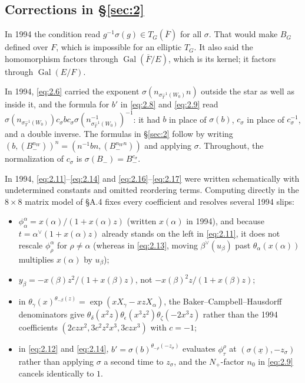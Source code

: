 \documentclass[12pt,letterpaper]{amsart}
\theoremstyle{plain}
\theoremstyle{definition}
\theoremstyle{remark}
\theoremstyle{definition}
\newcommand{\ovF}{\overline{F}}
\newcommand{\eps}{\epsilon}
\newcommand{\unx}{\underline{x}}
\DeclareMathOperator{\Gal}{Gal}
\begin{document}
\subsection*{Corrections in \S\ref{sec:2}}

\begin{rem26}\label{rem:2.cocycle}
In 1994 the condition read $g^{-1}\sigma(g)\in T_G(\overline{F})$ for all
$\sigma$. That would make $B_G$ defined over $F$, which is impossible for an
elliptic $T_G$. It also said the homomorphism factors through
$\Gal(\ovF/E)$, which is its kernel; it factors through $\Gal(E/F)$.
\end{rem26}

\begin{rem26}\label{rem:2.8}
In 1994, \eqref{eq:2.6} carried the exponent
$\sigma(n_{\sigma_T^{-1}(W_0)}n)$ outside the star as well as inside it, and the
formula for $b'$ in \eqref{eq:2.8} and \eqref{eq:2.9} read
$\sigma(n_{\sigma^{-1}_T (W_0)})c_\sigma b
c_\sigma\sigma(n^{-1}_{\sigma^{-1}_T (W_0)})^{-1}$: it had $b$ in place of
$\sigma(b)$, $c_\sigma$ in place of $c_\sigma^{-1}$, and a double inverse. The formulas in \S\ref{sec:2} follow by writing
$(b,(B_-^{n_W}))^n=(n^{-1}bn,(B_-^{n_Wn}))$ and applying $\sigma$.
Throughout, the normalization of $c_\sigma$ is
$\sigma(B_-)=B_-^{c_\sigma}$.
\end{rem26}

\begin{rem26}\label{rem:2.11}
In 1994, \eqref{eq:2.11}--\eqref{eq:2.14} and \eqref{eq:2.16}--\eqref{eq:2.17}
were written schematically with undetermined constants and omitted reordering
terms. Computing directly in the $8\times 8$ matrix model of \S A.4 fixes every
coefficient and resolves several 1994 slips:
\begin{itemize}
\item $\phi^\alpha_\alpha=x(\alpha)/(1+x(\alpha)z)$ (written $x(\alpha)$ in
1994), and because $t=\alpha^\vee(1+x(\alpha)z)$ already stands on the left in
\eqref{eq:2.11}, it does not rescale $\phi^\alpha_\rho$ for $\rho\neq\alpha$
(whereas in \eqref{eq:2.13}, moving $\beta^\vee(u_\beta)$ past $\theta_\alpha(x(\alpha))$
multiplies $x(\alpha)$ by $u_\beta$);
\item $y_\beta=-x(\beta)z^2/(1+x(\beta)z)$, not $-x(\beta)^2z/(1+x(\beta)z)$;
\item in $\theta_\gamma(x)^{\theta_{-\beta}(z)}=\exp(xX_\gamma-xzX_\alpha)$, the
Baker--Campbell--Hausdorff denominators give $\theta_\delta(x^2z)\theta_\eps(x^3z^2)\theta_\zeta(-2x^3z)$
rather than the 1994 coefficients $(2czx^2,3c^2z^2x^3,3czx^3)$ with $c=-1$;
\item in \eqref{eq:2.12} and \eqref{eq:2.14}, $b'=\sigma(b)^{\theta_{-\rho}(-z_\sigma)}$
evaluates $\phi^\rho_\tau$ at $(\sigma(\unx),-z_\sigma)$ rather than applying
$\sigma$ a second time to $z_\sigma$, and the $N_+$-factor $n_0$ in
\eqref{eq:2.9} cancels identically to $1$.
\end{itemize}
\end{rem26}
\end{document}
